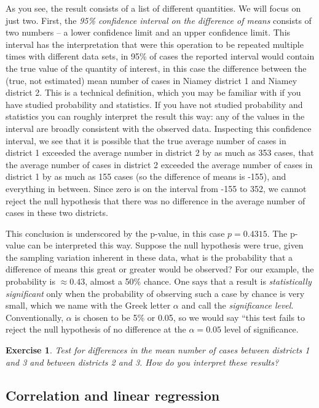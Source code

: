 \documentclass{article}\usepackage[]{graphicx}\usepackage[]{color}
\theoremstyle{exercise}
\newtheorem{exercise}{Exercise}
\begin{document}
As you see, the result consists of a list of different quantities. We will focus on just two. First, the \textit{95\% confidence interval on the difference of means} consists of two numbers -- a lower confidence limit and an upper confidence limit. This interval has the interpretation that were this operation to be repeated multiple times with different data sets, in 95\% of cases the reported interval would contain the true value of the quantity of interest, in this case the difference between the (true, not estimated) mean number of cases in Niamey district 1 and Niamey district 2. This is a technical definition, which you may be familiar with if you have studied probability and statistics. If you have not studied probability and statistics you can roughly interpret the result this way: any of the values in the interval are broadly consistent with the observed data. Inspecting this confidence interval, we see that it is possible that the true average number of cases in district 1 exceeded the average number in district 2 by as much as 353 cases, that the average number of cases in district 2 exceeded the average number of cases in district 1 by as much as 155 cases (so the difference of means is -155), and everything in between. Since zero is on the interval from -155 to 352, we cannot reject the null hypothesis that there was no difference in the average number of cases in these two districts.

This conclusion is underscored by the p-value, in this case $p=0.4315$. The p-value can be interpreted this way. Suppose the null hypothesis were true, given the sampling variation inherent in these data, what is the probability that a difference of means this great or greater would be observed? For our example, the probability is $\approx 0.43$, almost a 50\% chance. One says that a result is \textit{statistically significant} only when the probability of observing such a case by chance is very small, which we name with the Greek letter $\alpha$ and call the \textit{significance level}. Conventionally, $\alpha$ is chosen to be 5\% or 0.05, so we would say ``this test fails to reject the null hypothesis of no difference at the $\alpha=0.05$ level of significance.

\begin{exercise}
Test for differences in the mean number of cases between districts 1 and 3 and between districts 2 and 3. How do you interpret these results?
\end{exercise}

\subsection{Correlation and linear regression}
\end{document}

